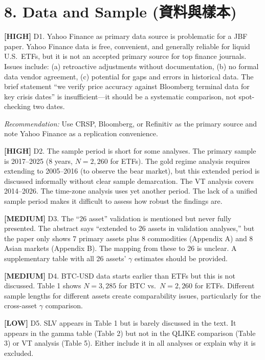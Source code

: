 \documentclass[12pt,a4paper]{article}
\newcommand{\high}[1]{\textcolor{errorred}{\textbf{[HIGH]} #1}}
\newcommand{\med}[1]{\textcolor{warncolor}{\textbf{[MEDIUM]} #1}}
\newcommand{\low}[1]{\textcolor{okgreen}{\textbf{[LOW]} #1}}
\begin{document}
\section*{8. Data and Sample (資料與樣本)}

\high{D1. Yahoo Finance as primary data source is problematic for a JBF paper.} Yahoo Finance data is free, convenient, and generally reliable for liquid U.S.\ ETFs, but it is not an accepted primary source for top finance journals. Issues include: (a) retroactive adjustments without documentation, (b) no formal data vendor agreement, (c) potential for gaps and errors in historical data. The brief statement ``we verify price accuracy against Bloomberg terminal data for key crisis dates'' is insufficient---it should be a systematic comparison, not spot-checking two dates.

\emph{Recommendation:} Use CRSP, Bloomberg, or Refinitiv as the primary source and note Yahoo Finance as a replication convenience.

\high{D2. The sample period is short for some analyses.} The primary sample is 2017--2025 (8 years, $N = 2{,}260$ for ETFs). The gold regime analysis requires extending to 2005--2016 (to observe the bear market), but this extended period is discussed informally without clear sample demarcation. The VT analysis covers 2014--2026. The time-zone analysis uses yet another period. The lack of a unified sample period makes it difficult to assess how robust the findings are.

\med{D3. The ``26 asset'' validation is mentioned but never fully presented.} The abstract says ``extended to 26 assets in validation analyses,'' but the paper only shows 7 primary assets plus 8 commodities (Appendix A) and 8 Asian markets (Appendix B). The mapping from these to 26 is unclear. A supplementary table with all 26 assets' $\gamma$ estimates should be provided.

\med{D4. BTC-USD data starts earlier than ETFs but this is not discussed.} Table 1 shows $N = 3{,}285$ for BTC vs.\ $N = 2{,}260$ for ETFs. Different sample lengths for different assets create comparability issues, particularly for the cross-asset $\gamma$ comparison.

\low{D5. SLV appears in Table 1 but is barely discussed in the text.} It appears in the gamma table (Table 2) but not in the QLIKE comparison (Table 3) or VT analysis (Table 5). Either include it in all analyses or explain why it is excluded.
\end{document}
